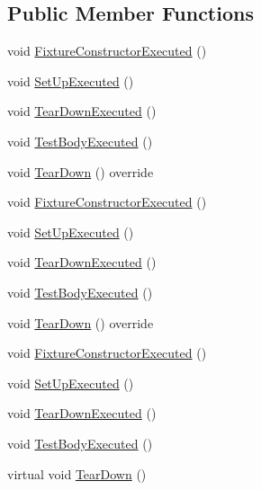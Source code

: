 \subsection*{Public Member Functions}
\begin{DoxyCompactItemize}
\item 
void \mbox{\hyperlink{class_test_generation_environment_abcdae77887fbd6dba18f4a55b80f058d}{Fixture\+Constructor\+Executed}} ()
\item 
void \mbox{\hyperlink{class_test_generation_environment_aa17c620af5eb9929bdbde25820cd8e28}{Set\+Up\+Executed}} ()
\item 
void \mbox{\hyperlink{class_test_generation_environment_a0d2576b10818bae1945e17e6e749ff9b}{Tear\+Down\+Executed}} ()
\item 
void \mbox{\hyperlink{class_test_generation_environment_a358a1d7cbefc3f9157f625f87dbde754}{Test\+Body\+Executed}} ()
\item 
void \mbox{\hyperlink{class_test_generation_environment_af7731d3161d89e3bd456cd204e2c4890}{Tear\+Down}} () override
\item 
void \mbox{\hyperlink{class_test_generation_environment_abcdae77887fbd6dba18f4a55b80f058d}{Fixture\+Constructor\+Executed}} ()
\item 
void \mbox{\hyperlink{class_test_generation_environment_aa17c620af5eb9929bdbde25820cd8e28}{Set\+Up\+Executed}} ()
\item 
void \mbox{\hyperlink{class_test_generation_environment_a0d2576b10818bae1945e17e6e749ff9b}{Tear\+Down\+Executed}} ()
\item 
void \mbox{\hyperlink{class_test_generation_environment_a358a1d7cbefc3f9157f625f87dbde754}{Test\+Body\+Executed}} ()
\item 
void \mbox{\hyperlink{class_test_generation_environment_af7731d3161d89e3bd456cd204e2c4890}{Tear\+Down}} () override
\item 
void \mbox{\hyperlink{class_test_generation_environment_abcdae77887fbd6dba18f4a55b80f058d}{Fixture\+Constructor\+Executed}} ()
\item 
void \mbox{\hyperlink{class_test_generation_environment_aa17c620af5eb9929bdbde25820cd8e28}{Set\+Up\+Executed}} ()
\item 
void \mbox{\hyperlink{class_test_generation_environment_a0d2576b10818bae1945e17e6e749ff9b}{Tear\+Down\+Executed}} ()
\item 
void \mbox{\hyperlink{class_test_generation_environment_a358a1d7cbefc3f9157f625f87dbde754}{Test\+Body\+Executed}} ()
\item 
virtual void \mbox{\hyperlink{class_test_generation_environment_ac3787d8afb43b97b0b3d6dec78b04798}{Tear\+Down}} ()
\end{DoxyCompactItemize}
